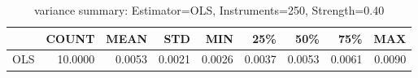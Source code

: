\begin{table}[ht]
\centering
\caption{variance summary: Estimator=OLS, Instruments=250, Strength=0.40}
\begin{tabular}{lrrrrrrrr}
\toprule
 & COUNT & MEAN & STD & MIN & 25\% & 50\% & 75\% & MAX \\
\midrule
OLS & 10.0000 & 0.0053 & 0.0021 & 0.0026 & 0.0037 & 0.0053 & 0.0061 & 0.0090 \\
\bottomrule
\end{tabular}
\end{table}
